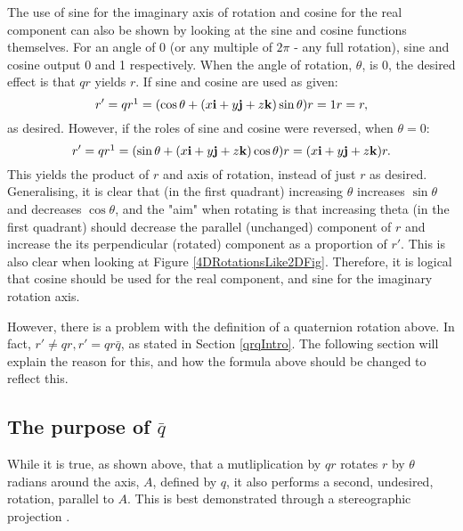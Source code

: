 \documentclass[10pt]{article}
\begin{document}
The use of sine for the imaginary axis of rotation and cosine for the real component can also be shown by looking at the sine and cosine functions themselves. For an angle of 0 (or any multiple of $2\pi$ - any full rotation), sine and cosine output 0 and 1 respectively. When the angle of rotation, $\theta$, is 0, the desired effect is that $qr$ yields $r$. If sine and cosine are used as given:
\begin{equation}
    r' = qr\footnotemark[1] = (\cos\theta + (x\vb{i} + y\vb{j} + z\vb{k})\sin\theta)r = 1r = r,
\end{equation}
as desired. However, if the roles of sine and cosine were reversed, when $\theta = 0$:
\begin{equation}
    r' = qr\footnotemark[1] = (\sin\theta + (x\vb{i} + y\vb{j} + z\vb{k})\cos\theta)r = (x\vb{i} + y\vb{j} + z\vb{k})r.
\end{equation}
This yields the product of $r$ and axis of rotation, instead of just $r$ as desired. Generalising, it is clear that (in the first quadrant) increasing $\theta$ increases $\sin\theta$ and decreases $\cos\theta$, and the "aim" when rotating is that increasing theta (in the first quadrant) should decrease the parallel (unchanged) component of $r$ and increase the its perpendicular (rotated) component as a proportion of $r'$. This is also clear when looking at Figure \ref{4DRotationsLike2DFig}. Therefore, it is logical that cosine should be used for the real component, and sine for the imaginary rotation axis.

However, there is a problem with the definition of a quaternion rotation above. In fact, $r' \neq qr, r' = qr\bar{q}$, as stated in Section \ref{qrqIntro}. The following section will explain the reason for this, and how the formula above should be changed to reflect this.

\subsection{The purpose of $\bar{q}$} \label{QBarSection}

While it is true, as shown above, that a mutliplication by $qr$ rotates $r$ by $\theta$ radians around the axis, $A$, defined by $q$, it also performs a second, undesired, rotation, parallel to $A$. This is best demonstrated through a stereographic projection \cite{Eater} \cite{Penguin}.
\end{document}
